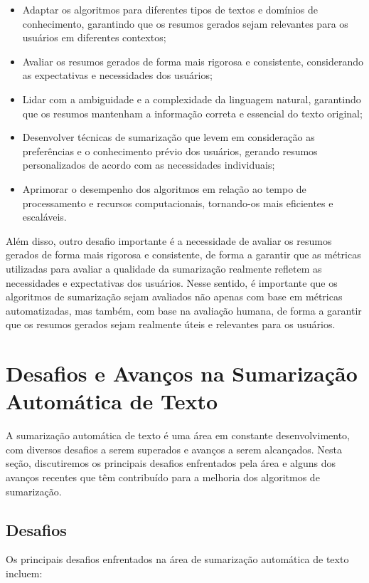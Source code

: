 \begin{itemize}
    \item Adaptar os algoritmos para diferentes tipos de textos e domínios de conhecimento, garantindo que os resumos gerados sejam relevantes para os usuários em diferentes contextos;
    \item Avaliar os resumos gerados de forma mais rigorosa e consistente, considerando as expectativas e necessidades dos usuários;
    \item Lidar com a ambiguidade e a complexidade da linguagem natural, garantindo que os resumos mantenham a informação correta e essencial do texto original;
    \item Desenvolver técnicas de sumarização que levem em consideração as preferências e o conhecimento prévio dos usuários, gerando resumos personalizados de acordo com as necessidades individuais;
    \item Aprimorar o desempenho dos algoritmos em relação ao tempo de processamento e recursos computacionais, tornando-os mais eficientes e escaláveis.
\end{itemize}

Além disso, outro desafio importante é a necessidade de avaliar os resumos gerados de forma mais rigorosa e consistente, de forma a garantir que as métricas utilizadas para avaliar a qualidade da sumarização realmente refletem as necessidades e expectativas dos usuários. Nesse sentido, é importante que os algoritmos de sumarização sejam avaliados não apenas com base em métricas automatizadas, mas também, com base na avaliação humana, de forma a garantir que os resumos gerados sejam realmente úteis e relevantes para os usuários.

\section{Desafios e Avanços na Sumarização Automática de Texto}
\label{sec:desafios-e-avancos}

A sumarização automática de texto é uma área em constante desenvolvimento, com diversos desafios a serem superados 
e avanços a serem alcançados. Nesta seção, discutiremos os principais desafios enfrentados pela área e alguns dos 
avanços recentes que têm contribuído para a melhoria dos algoritmos de sumarização.

\subsection{Desafios}
Os principais desafios enfrentados na área de sumarização automática de texto incluem:

